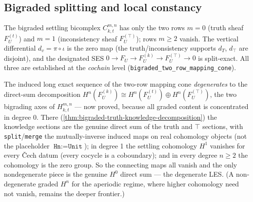 \subsection{Bigraded splitting and local constancy}

\begin{theorem}\label{thm:bigraded-two-row}\leanok{}
The bigraded settling bicomplex $C^{m,n}_{k,t}$ has only the two rows $m=0$ (truth sheaf
$F_U^{(t)}$) and $m=1$ (inconsistency sheaf $F_U^{(\top)}$); rows $m\ge 2$ vanish. The vertical
differential $d_v = \pi\circ\iota$ is the zero map (the truth/inconsistency supports $d_T$,
$d_{\top}$ are disjoint), and the designated SES $0\to F_U\to F_U^{(k)}\to F_U^{(\top)}\to 0$ is
split-exact. All three are established at the \emph{cochain} level
(\texttt{bigraded\_two\_row\_mapping\_cone}).
\end{theorem}

\begin{theorem}\label{thm:bigraded-truth-knowledge-les}\leanok{}
The induced long exact sequence of the two-row mapping cone \emph{degenerates} to the direct-sum
decomposition $H^n(F_U^{(k)}) \cong H^n(F_U^{(t)}) \oplus H^n(F_U^{(\top)})$, the two bigrading axes
of $H^{m,n}_{k,t}$ --- now proved, because all graded content is concentrated in degree 0. There
(\cref{thm:bigraded-truth-knowledge-decomposition}) the knowledge sections are the genuine direct sum
of the truth and $\top$ sections, with \texttt{split}/\texttt{merge} the mutually-inverse induced
maps on real cohomology objects (not the placeholder $\texttt{Hn}:=\texttt{Unit}$); in degree 1 the
settling cohomology $H^1$ vanishes for every \v{C}ech datum (every cocycle is a coboundary); and in
every degree $n\ge 2$ the cohomology is the zero group. So the connecting maps all vanish and the
only nondegenerate piece is the genuine $H^0$ direct sum --- the degenerate LES. (A non-degenerate
graded $H^n$ for the aperiodic regime, where higher cohomology need not vanish, remains the deeper
frontier.)
\end{theorem}

